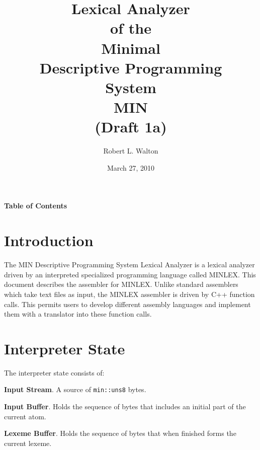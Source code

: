 \documentclass[12pt]{article}
\begin{document}
        
\title{Lexical Analyzer\\[2ex]of the\\[2ex]
       Minimal\\Descriptive Programming\\System\\[2ex]MIN\\[2ex]
       (Draft 1a)}

\author{Robert L. Walton}

\date{March 27, 2010}
 
\maketitle

\newpage
\begin{center}
\large \bf Table of Contents
\end{center}

\bigskip

\tableofcontents 

\newpage

\section{Introduction}

The MIN Descriptive Programming System Lexical Analyzer is a lexical
analyzer driven by an interpreted specialized programming language
called MINLEX.  This document describes the assembler for MINLEX.
Unlike standard assemblers which take text files as input, the
MINLEX assembler is driven by C++ function calls.  This permits
users to develop different assembly languages and implement them
with a translator into these function calls.

\section{Interpreter State}

The interpreter state consists of:

\begin{list}{}{}
\item {\bf Input Stream}. A source of {\tt min::uns8} bytes.

\item {\bf Input Buffer}.  Holds the sequence of bytes that includes
an initial part of the current atom.

\item {\bf Lexeme Buffer}.  Holds the sequence of bytes that when
finished forms the current lexeme.

\end{list}




\printindex
\end{document}
